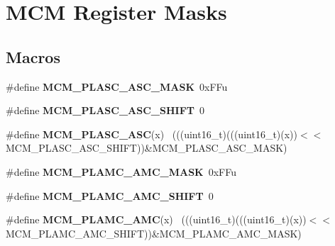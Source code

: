 \hypertarget{group___m_c_m___register___masks}{}\section{M\+C\+M Register Masks}
\label{group___m_c_m___register___masks}
\subsection*{Macros}
\begin{DoxyCompactItemize}
\item 
\hypertarget{group___m_c_m___register___masks_ga215cf860c41174735020a34e7ccf9590}{}\#define {\bfseries M\+C\+M\+\_\+\+P\+L\+A\+S\+C\+\_\+\+A\+S\+C\+\_\+\+M\+A\+S\+K}~0x\+F\+Fu\label{group___m_c_m___register___masks_ga215cf860c41174735020a34e7ccf9590}

\item 
\hypertarget{group___m_c_m___register___masks_ga88f833168fd51e1b3c950e21b00bbfc3}{}\#define {\bfseries M\+C\+M\+\_\+\+P\+L\+A\+S\+C\+\_\+\+A\+S\+C\+\_\+\+S\+H\+I\+F\+T}~0\label{group___m_c_m___register___masks_ga88f833168fd51e1b3c950e21b00bbfc3}

\item 
\hypertarget{group___m_c_m___register___masks_gadbabfd7e827544257764056bbc98fd34}{}\#define {\bfseries M\+C\+M\+\_\+\+P\+L\+A\+S\+C\+\_\+\+A\+S\+C}(x)                                              ~(((uint16\+\_\+t)(((uint16\+\_\+t)(x))$<$$<$M\+C\+M\+\_\+\+P\+L\+A\+S\+C\+\_\+\+A\+S\+C\+\_\+\+S\+H\+I\+F\+T))\&M\+C\+M\+\_\+\+P\+L\+A\+S\+C\+\_\+\+A\+S\+C\+\_\+\+M\+A\+S\+K)\label{group___m_c_m___register___masks_gadbabfd7e827544257764056bbc98fd34}

\item 
\hypertarget{group___m_c_m___register___masks_ga7988227df54012705c7f522f348214ee}{}\#define {\bfseries M\+C\+M\+\_\+\+P\+L\+A\+M\+C\+\_\+\+A\+M\+C\+\_\+\+M\+A\+S\+K}~0x\+F\+Fu\label{group___m_c_m___register___masks_ga7988227df54012705c7f522f348214ee}

\item 
\hypertarget{group___m_c_m___register___masks_gaa1b3153d0bf749f80fffacd948dd4bd4}{}\#define {\bfseries M\+C\+M\+\_\+\+P\+L\+A\+M\+C\+\_\+\+A\+M\+C\+\_\+\+S\+H\+I\+F\+T}~0\label{group___m_c_m___register___masks_gaa1b3153d0bf749f80fffacd948dd4bd4}

\item 
\hypertarget{group___m_c_m___register___masks_ga62d94ee71c272adf6c5a19fad692672c}{}\#define {\bfseries M\+C\+M\+\_\+\+P\+L\+A\+M\+C\+\_\+\+A\+M\+C}(x)                                              ~(((uint16\+\_\+t)(((uint16\+\_\+t)(x))$<$$<$M\+C\+M\+\_\+\+P\+L\+A\+M\+C\+\_\+\+A\+M\+C\+\_\+\+S\+H\+I\+F\+T))\&M\+C\+M\+\_\+\+P\+L\+A\+M\+C\+\_\+\+A\+M\+C\+\_\+\+M\+A\+S\+K)\label{group___m_c_m___register___masks_ga62d94ee71c272adf6c5a19fad692672c}


\end{DoxyCompactItemize}
